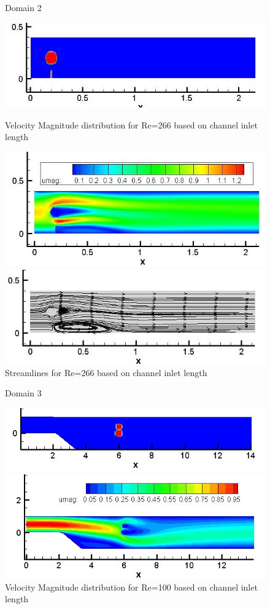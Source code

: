 \documentclass[12pt]{elsarticle}
\begin{document}
	\begin{figure}[h]
		\caption{Domain 2}
		\centering\includegraphics[width=0.7\linewidth]{57_immerssed_boundary_umag_domain}
		\caption{Velocity Magnitude distribution for Re=266 based on channel inlet length}
		\centering\includegraphics[width=0.7\linewidth]{57_immerssed_boundary_umag}
		\caption{Streamlines for Re=266 based on channel inlet length}
		\centering\includegraphics[width=0.7\linewidth]{57_immerssed_boundary_streamilnes}
	\end{figure}
	
	\begin{figure}[h]
		\caption{Domain 3}
		\centering\includegraphics[width=0.7\linewidth]{56_immerssed_boundary_domain}
		\caption{Velocity Magnitude distribution for Re=100 based on channel inlet length}
		\centering\includegraphics[width=0.7\linewidth]{56_immerssed_boundary_umag}
	\end{figure}
	
\end{document}
